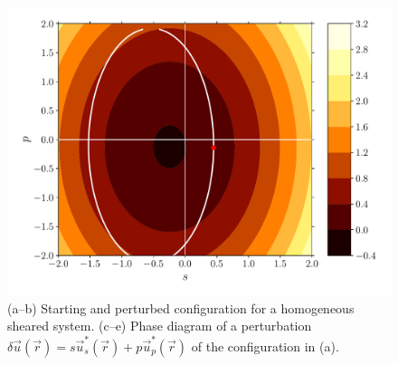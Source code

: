 \documentclass[fleqn]{goose-article}
\begin{document}
\begin{figure}[htp]
\begin{minipage}[t]{.31\textwidth}
        \includegraphics[width=\textwidth]{example_prestress_phase-diagram_energy-contour.pdf}
    \end{minipage}
    \caption{
        (a--b) Starting and perturbed configuration for a homogeneous sheared system.
        (c--e) Phase diagram of a perturbation
        $\delta \vec{u}(\vec{r}) = s \vec{u}^*_s (\vec{r}) + p \vec{u}^*_p (\vec{r})$
        of the configuration in (a).
    }
    \label{fig:example:prestress}
\end{figure}
\end{document}
